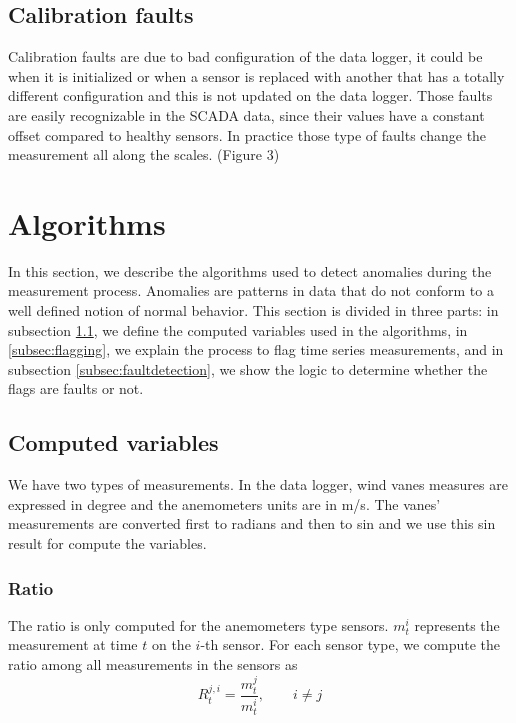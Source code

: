 \documentclass[journal]{IEEEtran}
\begin{document}
\subsection{Calibration faults} 
Calibration faults are due to bad configuration of the data logger, it could be when it is initialized or when a sensor is replaced with another that has a totally different configuration and this is not updated on the data logger. Those faults are easily recognizable in the SCADA data, since their values have a constant offset compared to healthy sensors. In practice those type of faults change the measurement all along the scales. (Figure 3)


\section{Algorithms}\label{sec:algorithms}
In this section, we describe the algorithms used to detect anomalies during the measurement process. Anomalies are patterns in data that do not conform to a well defined notion of normal behavior. This section is divided in three parts: in subsection \ref{subsec:computedvariables}, we define the computed variables used in the algorithms, in \ref{subsec:flagging}, we explain the process to flag time series measurements, and in subsection \ref{subsec:faultdetection}, we show the logic to determine whether the flags are faults or not.  
\subsection{Computed variables}\label{subsec:computedvariables}
We have two types of measurements. In the data logger, wind vanes measures are expressed in degree and the anemometers units are in m/s. The  vanes' measurements are converted first to radians and then to sin and we use this sin result for compute the variables.
\subsubsection{Ratio}
The ratio is only computed for the anemometers type sensors. $m_t^{i}$ represents the measurement at time $t$ on the $i$-th sensor.
For each sensor type, we compute the ratio among all measurements in the sensors as
\begin{equation}
R_{t}^{j,i} = \frac{m_{t}^{j}}{m_{t}^{i}},\qquad i \neq j 
\end{equation} 
\end{document}
